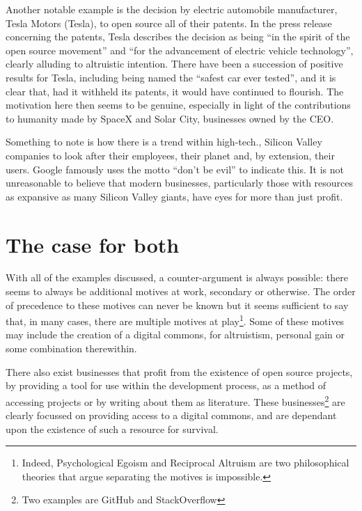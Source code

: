 \documentclass[a4paper]{article}
\begin{document}
Another notable example is the decision by electric automobile manufacturer, Tesla Motors\cite{tesla} (Tesla), to open source all of their patents\cite{teslapatents}. In the press release concerning the patents, Tesla describes the decision as being “in the spirit of the open source movement” and “for the advancement of electric vehicle technology”, clearly alluding to altruistic intention. There have been a succession of positive results for Tesla, including being named the “safest car ever tested”\cite{teslasafety}, and it is clear that, had it withheld its patents, it would have continued to flourish. The motivation here then seems to be genuine, especially in light of the contributions to humanity made by SpaceX\cite{spacex} and Solar City\cite{solarcity}, businesses owned by the CEO\cite{elonmusk}.

Something to note is how there is a trend within high-tech., Silicon Valley companies to look after their employees\cite{googlebenefits}, their planet\cite{appleenvironment} and, by extension, their users. Google famously uses the motto “don’t be evil” to indicate this\cite{dontbeevil}. It is not unreasonable to believe that modern businesses, particularly those with resources as expansive as many Silicon Valley giants, have eyes for more than just profit.

\section{The case for both}

With all of the examples discussed, a counter-argument is always possible: there seems to always be additional motives at work, secondary or otherwise. The order of precedence to these motives can never be known but it seems sufficient to say that, in many cases, there are multiple motives at play\footnote{Indeed, Psychological Egoism and Reciprocal Altruism are two philosophical theories that argue separating the motives is impossible.}. Some of these motives may include the creation of a digital commons, for altruistism, personal gain or some combination therewithin.

There also exist businesses that profit from the existence of open source projects, by providing a tool for use within the development process, as a method of accessing projects or by writing about them as literature. These businesses\footnote{Two examples are GitHub\cite{github} and StackOverflow} are clearly focussed on providing access to a digital commons, and are dependant upon the existence of such a resource for survival.
\end{document}
